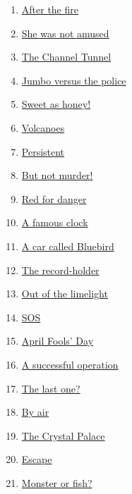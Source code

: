 \documentclass[11pt]{article}
\begin{document}
\begin{multicols}{2}
\begin{enumerate}
		\item \href{https://mp.weixin.qq.com/s/ldWXEtWEbPLHAgblKuERCg}{After the fire}	%
		\item \href{https://mp.weixin.qq.com/s/xyl3Kl3Uu8Kqh7W6dqt6Xw}{She was not amused}	%
		\item \href{https://mp.weixin.qq.com/s/JA9Q4WDgxTPed-xcU23Itw}{The Channel Tunnel}	%
		\item \href{https://mp.weixin.qq.com/s/NZFExzTS5Kp2F91TXrc9Fw}{Jumbo versus the police}	%
		\item \href{https://mp.weixin.qq.com/s/gzScY1qNxQc3_kZ0mphLyQ}{Sweet as honey!}	%
		\item \href{https://mp.weixin.qq.com/s/xo4hZuglEu5_-2jMceVTxg}{Volcanoes}	%
		\item \href{https://mp.weixin.qq.com/s/RrEmkWWnERgllMOU7ZPWtA}{Persistent}	%
		\item \href{https://mp.weixin.qq.com/s/o-EWEqKe4HV2yi8cM_QGpA}{ But not murder!}	%
		\item \href{https://mp.weixin.qq.com/s/DTrY8-AfJwZ-uc7D-d2NIw}{Red for danger}	%
		\item \href{https://mp.weixin.qq.com/s/kr4YnE2Yg48T1io1Xg1jgA}{A famous clock}	%
		\item \href{https://mp.weixin.qq.com/s/rE4WaBp1lxTRRbi6yY8_Zw}{A car called Bluebird}	%
		\item \href{https://mp.weixin.qq.com/s/VLAZLpyV0GWUUOzp8WCo1A}{The record-holder}	%
		\item \href{https://mp.weixin.qq.com/s/wkH_5kMyCevIbiMNz8CYVg}{Out of the limelight}	%
		\item \href{https://mp.weixin.qq.com/s/NGifbTaGFQqRDktweMN8Pg}{SOS}	%
		\item \href{https://mp.weixin.qq.com/s/zUT_GdBJdFX1xC8IplASwg}{April Fools' Day}	%
		\item \href{https://mp.weixin.qq.com/s/Bad0dS9l6VrsRUxCt_XB5w}{A successful operation}	%
		\item \href{https://mp.weixin.qq.com/s/3QX3ERTV31Ncn3pqmaVItw}{The last one?}	%
		\item \href{https://mp.weixin.qq.com/s/Lk0D0xOQl1zCksnE3zagCQ}{By air}	%
		\item \href{https://mp.weixin.qq.com/s/tTbfmYHnB7w-pmxIgdf2Wg}{The Crystal Palace}	%
		\item \href{https://mp.weixin.qq.com/s/bO2KedAuzrlgxpnyQRBZ_w}{Escape}	%
		\item \href{https://mp.weixin.qq.com/s/qe3g1AQIJMpbldKdZTAQLw}{Monster or fish?}	%

\end{enumerate}
\end{multicols}
\end{document}
